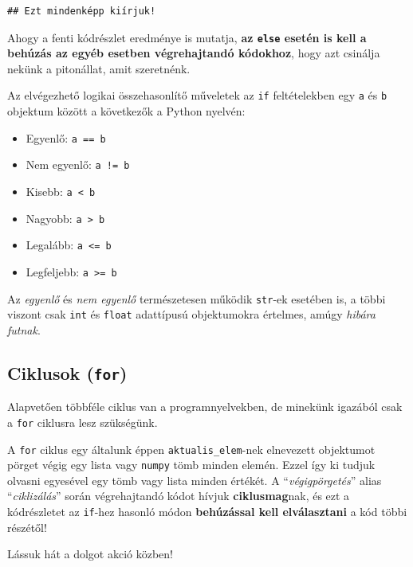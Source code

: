 \documentclass[
]{book}
\providecommand{\tightlist}{%
  \setlength{\itemsep}{0pt}\setlength{\parskip}{0pt}}
\begin{document}
\begin{verbatim}
## Ezt mindenképp kiírjuk!
\end{verbatim}

Ahogy a fenti kódrészlet eredménye is mutatja, \textbf{az \texttt{else} esetén is kell a behúzás az egyéb esetben végrehajtandó kódokhoz}, hogy azt csinálja nekünk a pitonállat, amit szeretnénk.

Az elvégezhető logikai összehasonlítő műveletek az \texttt{if} feltételekben egy \texttt{a} és \texttt{b} objektum között a következők a Python nyelvén:

\begin{itemize}
\tightlist
\item
  Egyenlő: \texttt{a\ ==\ b}
\item
  Nem egyenlő: \texttt{a\ !=\ b}
\item
  Kisebb: \texttt{a\ \textless{}\ b}
\item
  Nagyobb: \texttt{a\ \textgreater{}\ b}
\item
  Legalább: \texttt{a\ \textless{}=\ b}
\item
  Legfeljebb: \texttt{a\ \textgreater{}=\ b}
\end{itemize}

Az \emph{egyenlő} és \emph{nem egyenlő} természetesen működik \texttt{str}-ek esetében is, a többi viszont csak \texttt{int} és \texttt{float} adattípusú objektumokra értelmes, amúgy \emph{hibára futnak}.

\subsection{\texorpdfstring{Ciklusok (\texttt{for})}{Ciklusok (for)}}\label{ciklusok-for}

Alapvetően többféle ciklus van a programnyelvekben, de minekünk igazából csak a \texttt{for} ciklusra lesz szükségünk.

A \texttt{for} ciklus egy általunk éppen \texttt{aktualis\_elem}-nek elnevezett objektumot pörget végig egy lista vagy \texttt{numpy} tömb minden elemén. Ezzel így ki tudjuk olvasni egyesével egy tömb vagy lista minden értékét. A ``\emph{végigpörgetés}'' alias ``\emph{ciklizálás}'' során végrehajtandó kódot hívjuk \textbf{ciklusmag}nak, és ezt a kódrészletet az \texttt{if}-hez hasonló módon \textbf{behúzással kell elválasztani} a kód többi részétől!

Lássuk hát a dolgot akció közben!
\end{document}
